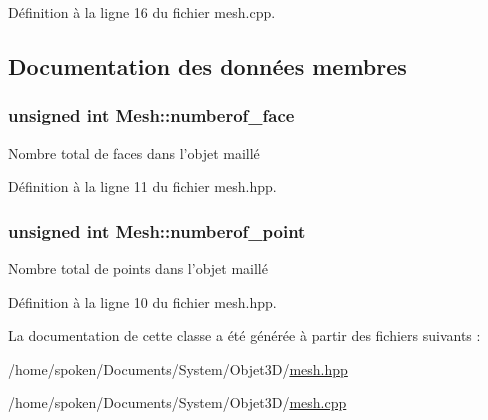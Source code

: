 Définition à la ligne 16 du fichier mesh.\-cpp.



\subsection{Documentation des données membres}
\hypertarget{class_mesh_a8ad7f6788ff772d5e0e17e992571f364}{
\subsubsection[{numberof\-\_\-face}]{\setlength{\rightskip}{0pt plus 5cm}unsigned int Mesh\-::numberof\-\_\-face\hspace{0.3cm}{\ttfamily [private]}}}\label{class_mesh_a8ad7f6788ff772d5e0e17e992571f364}
Nombre total de faces dans l'objet maillé 

Définition à la ligne 11 du fichier mesh.\-hpp.

\hypertarget{class_mesh_a9c058bf3f414b6119d7e6ea09703057d}{
\subsubsection[{numberof\-\_\-point}]{\setlength{\rightskip}{0pt plus 5cm}unsigned int Mesh\-::numberof\-\_\-point\hspace{0.3cm}{\ttfamily [private]}}}\label{class_mesh_a9c058bf3f414b6119d7e6ea09703057d}
Nombre total de points dans l'objet maillé 

Définition à la ligne 10 du fichier mesh.\-hpp.



La documentation de cette classe a été générée à partir des fichiers suivants \-:\begin{DoxyCompactItemize}
\item 
/home/spoken/\-Documents/\-System/\-Objet3\-D/\hyperlink{mesh_8hpp}{mesh.\-hpp}\item 
/home/spoken/\-Documents/\-System/\-Objet3\-D/\hyperlink{mesh_8cpp}{mesh.\-cpp}\end{DoxyCompactItemize}
